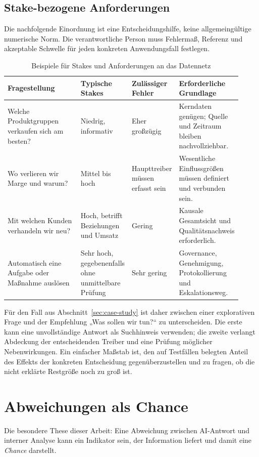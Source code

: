 \documentclass[a4paper,12pt]{article}
\theoremstyle{definition}
\begin{document}
\subsection{Stake-bezogene Anforderungen}
Die nachfolgende Einordnung ist eine Entscheidungshilfe, keine allgemeingültige numerische Norm. Die verantwortliche Person muss Fehlermaß, Referenz und akzeptable Schwelle für jeden konkreten Anwendungsfall festlegen.

\begin{table}[htbp]
\centering
\small
\caption{Beispiele für Stakes und Anforderungen an das Datennetz}
\label{tab:stakes}
\begin{tabular}{p{0.34\linewidth}p{0.20\linewidth}p{0.19\linewidth}p{0.19\linewidth}}
\toprule
\textbf{Fragestellung} & \textbf{Typische Stakes} & \textbf{Zulässiger Fehler} & \textbf{Erforderliche Grundlage} \\
\midrule
Welche Produktgruppen verkaufen sich am besten? & Niedrig, informativ & Eher großzügig & Kerndaten genügen; Quelle und Zeitraum bleiben nachvollziehbar. \\
Wo verlieren wir Marge und warum? & Mittel bis hoch & Haupttreiber müssen erfasst sein & Wesentliche Einflussgrößen müssen definiert und verbunden sein. \\
Mit welchen Kunden verhandeln wir neu? & Hoch, betrifft Beziehungen und Umsatz & Gering & Kausale Gesamtsicht und Qualitätsnachweis erforderlich. \\
Automatisch eine Aufgabe oder Maßnahme auslösen & Sehr hoch, gegebenenfalls ohne unmittelbare Prüfung & Sehr gering & Governance, Genehmigung, Protokollierung und Eskalationsweg. \\
\bottomrule
\end{tabular}
\end{table}

Für den Fall aus Abschnitt~\ref{sec:case-study} ist daher zwischen einer explorativen Frage und der Empfehlung „Was sollen wir tun?“ zu unterscheiden. Die erste kann eine unvollständige Antwort als Suchhinweis verwenden; die zweite verlangt Abdeckung der entscheidenden Treiber und eine Prüfung möglicher Nebenwirkungen. Ein einfacher Maßstab ist, den auf Testfällen belegten Anteil des Effekts der konkreten Entscheidung gegenüberzustellen und zu fragen, ob die nicht erklärte Restgröße noch zu groß ist.

\section{Abweichungen als Chance}\label{sec:opportunity}
Die besondere These dieser Arbeit: Eine Abweichung zwischen AI-Antwort und interner Analyse kann ein Indikator sein, der Information liefert und damit eine \emph{Chance} darstellt.
\end{document}
